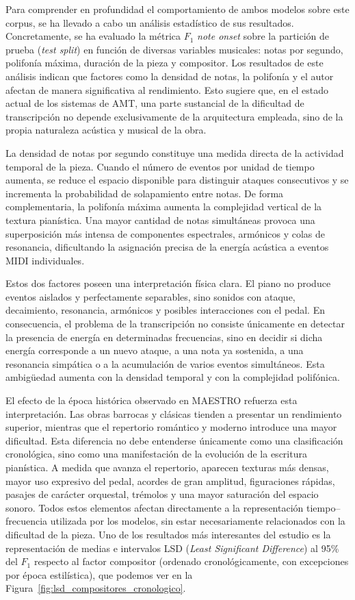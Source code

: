 \documentclass[11pt,spanish,listoffigures,listoftables]{tfgetsinf}
\begin{document}
Para comprender en profundidad el comportamiento de ambos modelos sobre este corpus, se ha llevado a cabo un análisis estadístico
de sus resultados. Concretamente, se ha evaluado la métrica $F_1$ \textit{note onset} sobre la partición de prueba (\textit{test split}) en
función de diversas variables musicales: notas por segundo, polifonía máxima, duración de la pieza y compositor. Los resultados de este
análisis indican que factores como la densidad de notas, la polifonía y el autor afectan de manera significativa al rendimiento. Esto sugiere
que, en el estado actual de los sistemas de AMT, una parte sustancial de la dificultad de transcripción no depende exclusivamente de la
arquitectura empleada, sino de la propia naturaleza acústica y musical de la obra.

La densidad de notas por segundo constituye una medida directa de la actividad temporal
de la pieza. Cuando el número de eventos por unidad de tiempo aumenta, se reduce el
espacio disponible para distinguir ataques consecutivos y se incrementa la probabilidad
de solapamiento entre notas. De forma complementaria, la polifonía máxima aumenta
la complejidad vertical de la textura pianística. Una mayor cantidad de notas simultáneas
provoca una superposición más intensa de componentes espectrales, armónicos y colas
de resonancia, dificultando la asignación precisa de la energía acústica a eventos MIDI
individuales.

Estos dos factores poseen una interpretación física clara. El piano no produce eventos
aislados y perfectamente separables, sino sonidos con ataque, decaimiento, resonancia,
armónicos y posibles interacciones con el pedal. En consecuencia, el problema de la
transcripción no consiste únicamente en detectar la presencia de energía en determinadas
frecuencias, sino en decidir si dicha energía corresponde a un nuevo ataque, a una nota
ya sostenida, a una resonancia simpática o a la acumulación de varios eventos
simultáneos. Esta ambigüedad aumenta con la densidad temporal y con la complejidad
polifónica.

El efecto de la época histórica observado en MAESTRO refuerza esta interpretación.
Las obras barrocas y clásicas tienden a presentar un rendimiento superior, mientras que
el repertorio romántico y moderno introduce una mayor dificultad. Esta diferencia no
debe entenderse únicamente como una clasificación cronológica, sino como una
manifestación de la evolución de la escritura pianística. A medida que avanza el
repertorio, aparecen texturas más densas, mayor uso expresivo del pedal, acordes de
gran amplitud, figuraciones rápidas, pasajes de carácter orquestal, trémolos y una
mayor saturación del espacio sonoro. Todos estos elementos afectan directamente a la
representación tiempo--frecuencia utilizada por los modelos, sin estar necesariamente relacionados con la dificultad de la pieza. Uno de los resultados más interesantes del estudio 
es la representación de medias e intervalos LSD (\textit{Least Significant Difference}) al 95\% del $F_1$ respecto al factor compositor (ordenado cronológicamente, con excepciones por época estilística), que podemos ver
en la Figura~\ref{fig:lsd_compositores_cronologico}.
\end{document}
